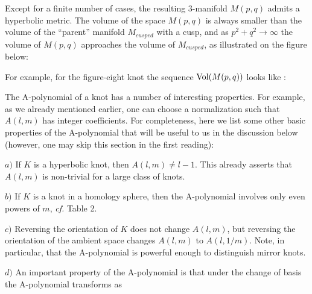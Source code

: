 Except for a finite number of cases, the resulting
3-manifold $M(p,q)$ admits a hyperbolic metric.
The volume of the space $M(p,q)$ is always smaller
than the volume of the ``parent'' manifold $M_{cusped}$
with a cusp, and as $p^2+q^2 \to \infty$ the volume
of $M(p,q)$ approaches the volume of $M_{cusped}$,
as illustrated on the figure below:
\bigskip

\ifig{}
{}

For example, for the figure-eight knot
the sequence ${\rm Vol} (M(p,q))$ looks like \NZagier:
%
\eqn{}
%



The A-polynomial of a knot has a number of interesting properties.
For example, as we already mentioned earlier, one can choose
a normalization such that $A(l,m)$ has integer coefficients.
For completeness, here we list some other basic properties of
the A-polynomial that will be useful to us in the discussion below
(however, one may skip this section in the first reading):

\item{$a)$}
If $K$ is a hyperbolic knot, then $A(l,m) \ne l-1$.
This already asserts that $A(l,m)$ is non-trivial
for a large class of knots.

\item{$b)$}
If $K$ is a knot in a homology sphere, then the A-polynomial
involves only even powers of $m$, {\it cf.} Table 2.

\item{$c)$}
Reversing the orientation of $K$ does not
change $A(l,m)$, but reversing the orientation of
the ambient space changes $A(l,m)$ to $A(l,1/m)$.
Note, in particular, that the A-polynomial is powerful
enough to distinguish mirror knots.

\item{$d)$}
An important property of the A-polynomial
is that under the change of basis
%
\eqn{}
%
the A-polynomial transforms as
%
\eqn{}
%

